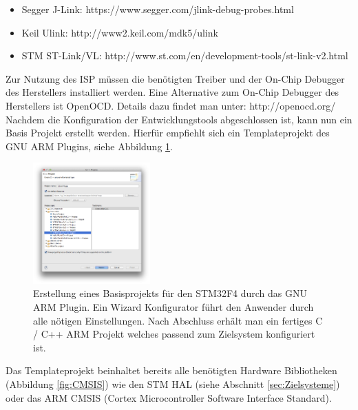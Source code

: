 \begin{itemize}
	\item Segger J-Link:
	\newline
	https://www.segger.com/jlink-debug-probes.html
	\item Keil Ulink: 
	\newline
	http://www2.keil.com/mdk5/ulink
	\item STM ST-Link/VL: 
	\newline
	http://www.st.com/en/development-tools/st-link-v2.html
\end{itemize}
Zur Nutzung des ISP müssen die benötigten Treiber und der On-Chip Debugger des Herstellers installiert werden. Eine Alternative zum On-Chip Debugger des Herstellers ist OpenOCD. Details dazu findet man unter:
\newline
\newline
http://openocd.org/
\newline
\newline            
Nachdem die Konfiguration der Entwicklungstools abgeschlossen ist, kann nun ein Basis Projekt erstellt werden. Hierfür empfiehlt sich ein Templateprojekt des GNU ARM Plugins, siehe Abbildung \ref{fig:NewProj}.
\begin{figure}[htb]
	\centering
		\includegraphics[width=0.4\textwidth]{Pictures/Einrichtung/NewF4Project.png}
	\caption{Erstellung eines Basisprojekts für den STM32F4 durch das GNU ARM Plugin. Ein Wizard Konfigurator führt den Anwender durch alle nötigen Einstellungen. Nach Abschluss erhält man ein fertiges C / C++ ARM Projekt welches passend zum Zielsystem konfiguriert ist.}
	\label{fig:NewProj}
\end{figure}
Das Templateprojekt beinhaltet bereits alle benötigten Hardware Bibliotheken (Abbildung \ref{fig:CMSIS}) wie den STM HAL (siehe Abschnitt \ref{sec:Zielsysteme}) oder das ARM CMSIS (Cortex Microcontroller Software Interface Standard).
